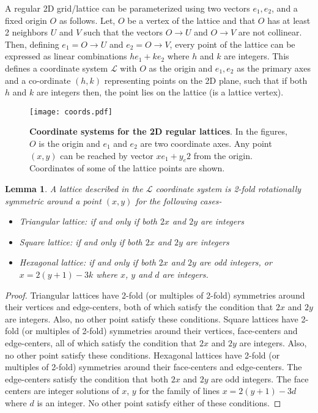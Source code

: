 \documentclass[11pt]{article}
\newtheorem{lemma}[thm]{Lemma}
\newcommand{\1}{\mathds{1}}
\begin{document}
A regular 2D grid/lattice can be parameterized using two vectors $e_1, e_2$, and a fixed origin $O$ as follows. Let, $O$ be a vertex of the lattice and that $O$ has at least 2 neighbors $U$ and $V$ such that the vectors $O\rightarrow U$ and $O\rightarrow V$ are not collinear. Then, defining $e_1 = O\rightarrow U$ and $e_2 = O\rightarrow V$, every point of the lattice can be expressed as linear combinations $he_1 + ke_2$ where $h$ and $k$ are integers. This defines a coordinate system $\mathcal{L}$ with $O$ as the origin and $e_1, e_2$ as the primary axes and a co-ordinate $(h,k)$ representing points on the 2D plane, such that if both $h$ and $k$ are integers then, the point lies on the lattice (is a lattice vertex). 


\begin{figure}[h!]
\centering
\texttt{[image: coords.pdf]}
\caption[Coordinate systems for the 2D regular lattices]{ \textbf{Coordinate systems for the 2D regular lattices}. In the figures, $O$ is the origin and $e_1$ and $e_2$ are two coordinate axes. Any point $(x,y)$ can be reached by vector $xe_1+y_e2$ from the origin. Coordinates of some of the lattice points are shown.}   
\label{fig:assemblytheory:coords}
\end{figure}

\begin{lemma}
 \label{lemma:assemblytheory:sufficient0}
 A lattice described in the $\mathcal{L}$ coordinate system is 2-fold rotationally symmetric around a point $(x,y)$ for the following cases-
 \begin{itemize}
  \item Triangular lattice: if and only if both $2x$ and $2y$ are integers
  \item Square lattice: if and only if both $2x$ and $2y$ are integers
  \item Hexagonal lattice: if and only if both $2x$ and $2y$ are odd integers, or $x=2(y+1)-3k$ where $x$, $y$ and $d$ are integers.
 \end{itemize}
\end{lemma}

\begin{proof}
 Triangular lattices have 2-fold (or multiples of 2-fold) symmetries around their vertices and edge-centers, both of which satisfy the condition that $2x$ and $2y$ are integers. Also, no other point satisfy these conditions.
 Square lattices have 2-fold (or multiples of 2-fold) symmetries around their vertices, face-centers and edge-centers, all of which satisfy the condition that $2x$ and $2y$ are integers. Also, no other point satisfy these conditions.
 Hexagonal lattices have 2-fold (or multiples of 2-fold) symmetries around their face-centers and edge-centers. The edge-centers satisfy the condition that both $2x$ and $2y$ are odd integers. The face centers are integer solutions of $x$, $y$ for the family of lines $x=2(y+1)-3d$ where $d$ is an integer. No other point satisfy either of these conditions.
\end{proof}
\end{document}
